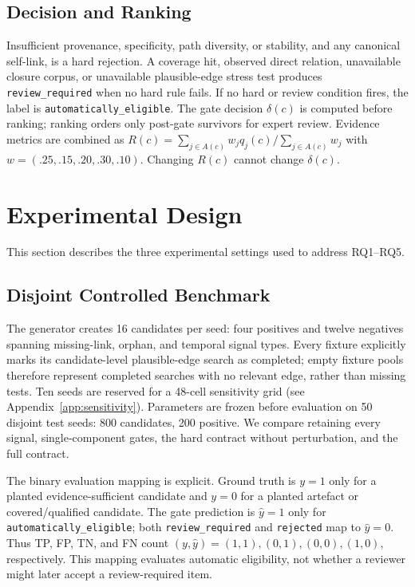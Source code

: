 \documentclass[conference, onecolumn]{IEEEtran}
\newcommand{\statuseligible}{\texttt{automatically\_eligible}}
\begin{document}
\subsection{Decision and Ranking}

Insufficient provenance, specificity, path diversity, or stability, and any canonical self-link, is a hard rejection. A coverage hit, observed direct relation, unavailable closure corpus, or unavailable plausible-edge stress test produces \texttt{review\_required} when no hard rule fails. If no hard or review condition fires, the label is \statuseligible{}. The gate decision $\delta(c)$ is computed before ranking; ranking orders only post-gate survivors for expert review. Evidence metrics are combined as $R(c)={\sum_{j\in A(c)}w_jq_j(c)}/{\sum_{j\in A(c)}w_j}$ with $w=(.25,.15,.20,.30,.10)$. Changing $R(c)$ cannot change $\delta(c)$.

\section{Experimental Design}

This section describes the three experimental settings used to address RQ1--RQ5.

\subsection{Disjoint Controlled Benchmark}

The generator creates 16 candidates per seed: four positives and twelve negatives spanning missing-link, orphan, and temporal signal types. Every fixture explicitly marks its candidate-level plausible-edge search as completed; empty fixture pools therefore represent completed searches with no relevant edge, rather than missing tests. Ten seeds are reserved for a 48-cell sensitivity grid (see Appendix~\ref{app:sensitivity}). Parameters are frozen before evaluation on 50 disjoint test seeds: 800 candidates, 200 positive. We compare retaining every signal, single-component gates, the hard contract without perturbation, and the full contract.

The binary evaluation mapping is explicit. Ground truth is $y=1$ only for a planted evidence-sufficient candidate and $y=0$ for a planted artefact or covered/qualified candidate. The gate prediction is $\hat y=1$ only for \statuseligible{}; both \texttt{review\_required} and \texttt{rejected} map to $\hat y=0$. Thus TP, FP, TN, and FN count $(y,\hat y)=(1,1),(0,1),(0,0),(1,0)$, respectively. This mapping evaluates automatic eligibility, not whether a reviewer might later accept a review-required item.
\end{document}
